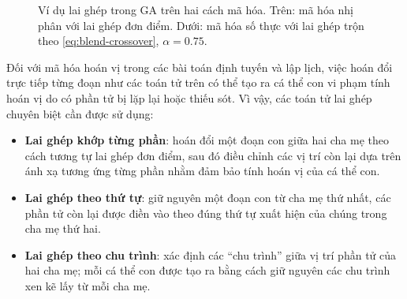 \begin{figure}[H]
\caption{Ví dụ lai ghép trong GA trên hai cách mã hóa. Trên: mã hóa
nhị phân với lai ghép đơn điểm. Dưới: mã hóa số thực với lai ghép trộn
theo \eqref{eq:blend-crossover}, $\alpha = 0.75$.}
\label{fig:ga-crossover}
\end{figure}

Đối với mã hóa hoán vị trong các bài toán định tuyến và lập lịch, việc
hoán đổi trực tiếp từng đoạn như các toán tử trên có thể tạo ra cá thể
con vi phạm tính hoán vị do có phần tử bị lặp lại hoặc thiếu sót. Vì
vậy, các toán tử lai ghép chuyên biệt cần được sử dụng:
\begin{itemize}
    \item \textbf{Lai ghép khớp từng phần}: hoán đổi một đoạn
    con giữa hai cha mẹ theo cách tương tự lai ghép đơn điểm, sau đó
    điều chỉnh các vị trí còn lại dựa trên ánh xạ tương ứng từng phần
    nhằm đảm bảo tính hoán vị của cá thể con.
    \item \textbf{Lai ghép theo thứ tự}: giữ nguyên một đoạn con từ cha
    mẹ thứ nhất, các phần tử còn lại được điền vào theo đúng thứ tự xuất
    hiện của chúng trong cha mẹ thứ hai.
    \item \textbf{Lai ghép theo chu trình}: xác định các ``chu trình'' giữa
    vị trí phần tử của hai cha mẹ; mỗi cá thể con được tạo ra bằng cách
    giữ nguyên các chu trình xen kẽ lấy từ mỗi cha mẹ.
\end{itemize}

